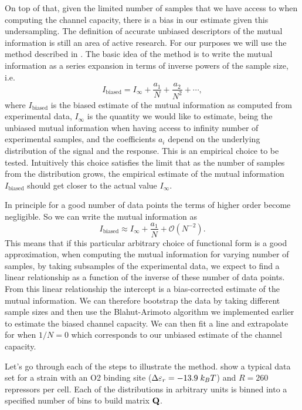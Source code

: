 On top of that, given the limited number of samples that we have access to when
computing the channel capacity, there is a bias in our estimate given this
undersampling. The definition of accurate unbiased descriptors of the mutual
information is still an area of active research. For our purposes we will use
the method described in \cite{Cheong2011a}. The basic idea of the method is to
write the mutual information as a series expansion in terms of inverse powers of
the sample size, i.e.
\begin{equation}
I_{\text{biased}} = I_\infty + \frac{a_1}{N} + \frac{a_2}{N^2} + \cdots,
\end{equation}
where $I_{\text{biased}}$ is the biased estimate of the mutual information as
computed from experimental data, $I_\infty$ is the quantity we would like to
estimate, being the unbiased mutual information when having access to infinity
number of experimental samples, and the coefficients $a_i$ depend on the
underlying distribution of the signal and the response. This is an empirical
choice to be tested. Intuitively this choice satisfies the limit that as the
number of samples from the distribution grows, the empirical estimate of the
mutual information $I_{\text{biased}}$ should get closer to the actual value
$I_\infty$.

In principle for a good number of data points the terms of higher order become
negligible. So we can write the mutual information as
\begin{equation}
I_{\text{biased}} \approx I_\infty + \frac{a_1}{N} + \mathcal{O}(N^{-2}).
\label{seq_mutual_biased}
\end{equation}
This means that if this particular arbitrary choice of functional form is  a
good approximation, when computing the mutual information for varying number of
samples, by taking subsamples of the experimental data, we expect to find a
linear relationship as a function of the inverse of these number of data points.
From this linear relationship the intercept is a bias-corrected estimate of the
mutual information. We can therefore bootstrap the data by taking different
sample sizes and then use the Blahut-Arimoto algorithm we implemented earlier to
estimate the biased channel capacity. We can then fit a line and extrapolate for
when $1/N = 0$ which corresponds to our unbiased estimate of the channel
capacity.

Let's go through each of the steps to illustrate the method.
 show a typical data set for a strain with an O2 binding
site ($\Delta\varepsilon_r = -13.9 \; k_BT$) and $R = 260$ repressors per cell. Each of the
distributions in arbitrary units is binned into a specified number of bins to
build matrix $\mathbf{Q}$.

